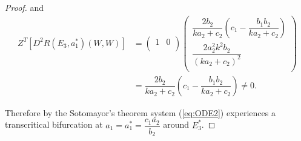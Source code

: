 \documentclass[10pt]{amsart}
\theoremstyle{definition}
\begin{document}
\begin{proof}
and 
\begin{equation*}
\begin{split}
Z^{T}\left[D^2 R\left(E_3,a_1^* \right)(W,W)\right] &= \left(
\begin{array}{cc}
 1 & 0 \\
\end{array}
\right) 
\left(
\begin{array}{ccc}
 \dfrac{2b_2}{ka_2+c_2}\left(c_1-\dfrac{b_1 b_2}{ka_2+c_2} \right)  \\
  \dfrac{2a_2^2 k^2 b_2}{\left(ka_2+c_2 \right)^2} \\
\end{array}
\right) \\
& =\dfrac{2b_2}{ka_2+c_2}\left(c_1-\dfrac{b_1 b_2}{ka_2+c_2} \right) \neq 0.
\end{split}
\end{equation*}

Therefore by the Sotomayor's theorem system (\ref{eq:ODE2}) experiences a transcritical bifurcation at $a_1=a_1^*=\dfrac{c_1a_2}{b_2}$ around $E_3^*$.
\end{proof}
\end{document}
